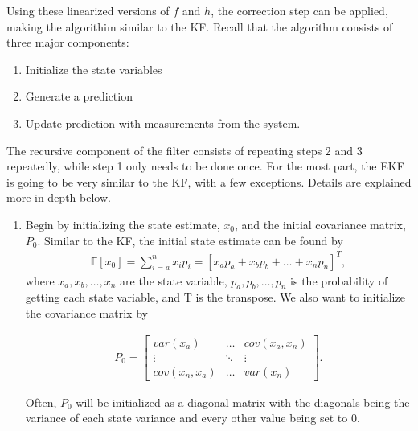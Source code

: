   \noindent Using these linearized versions of $f$ and $h$, the correction step can be applied, making the algorithim similar to the KF. Recall that the algorithm consists of three major components:
\begin{enumerate}
  \item Initialize the state variables
  \item Generate a prediction
  \item Update prediction with measurements from the system.
\end{enumerate}
The recursive component of the filter consists of repeating steps 2 and 3 repeatedly, while step 1 only needs to be done once. For the most part, the EKF is going to be very similar to the KF, with a few exceptions. Details are explained more in depth below.

\begin{enumerate}
  \item Begin by initializing the state estimate, $x_0$, and the initial covariance matrix, $P_0$. Similar to the KF, the initial state estimate can be found by 
  \begin{align*}
           \mathbb{E}[x_0]   = \sum^n_{i = a} x_i p_i = [x_a p_a + x_b p_b + \hdots + x_n p_n]^T,
      \end{align*}
 \noindent where  $x_a, x_b, \hdots, x_n$ are the state variable, $p_a, p_b, \hdots, p_n$ is the probability of getting each state variable, and T is the transpose. We also want to initialize the covariance matrix by

    
  \begin{align*}
      P_0 =
      \begin{bmatrix}
           var(x_a)  & \hdots & cov(x_a,x_n) \\
           \vdots & \ddots & \vdots \\
           cov(x_n, x_a)  & \hdots & var(x_n )
         \end{bmatrix} .
  \end{align*}  
  
  Often, $P_0 $ will be initialized as a diagonal matrix with the diagonals being the variance of each state variance and every other value being set to 0.
  

\end{enumerate}
